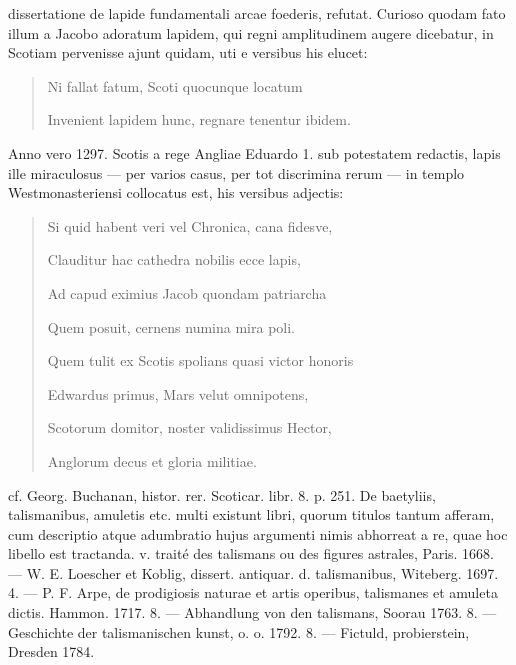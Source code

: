 \documentclass[a4paper, 11pt, oneside, polutonikogreek, german]{article}
\begin{document}
dissertatione de lapide fundamentali arcae foederis, refutat. Curioso quodam fato illum a Jacobo adoratum lapidem, qui regni amplitudinem augere dicebatur, in Scotiam pervenisse ajunt quidam, uti e versibus his elucet:
\begin{quotation}
Ni fallat fatum, Scoti quocunque locatum

Invenient lapidem hunc, regnare tenentur ibidem.
\end{quotation}
\hspace*{0mm}Anno vero 1297. Scotis a rege Angliae Eduardo 1. sub potestatem redactis, lapis ille miraculosus --- per varios casus, per tot discrimina rerum --- in templo Westmonasteriensi collocatus est, his versibus adjectis:
\begin{quotation}
Si quid habent veri vel Chronica, cana fidesve,

\hspace*{5mm}Clauditur hac cathedra nobilis ecce lapis,

Ad capud eximius Jacob quondam patriarcha

\hspace*{5mm}Quem posuit, cernens numina mira poli.

Quem tulit ex Scotis spolians quasi victor honoris

\hspace*{5mm}Edwardus primus, Mars velut omnipotens,

Scotorum domitor, noster validissimus Hector,

\hspace*{5mm}Anglorum decus et gloria militiae.
\end{quotation}
\hspace*{0mm}cf. Georg. Buchanan, histor. rer. Scoticar. libr. 8. p. 251. De baetyliis, talismanibus, amuletis etc. multi existunt libri, quorum titulos tantum afferam, cum descriptio atque adumbratio hujus argumenti nimis abhorreat a re, quae hoc libello est tractanda. v. traité des talismans ou des figures astrales, Paris. 1668. --- W. E. Loescher et Koblig, dissert. antiquar. d. talismanibus, Witeberg. 1697. 4. --- P. F. Arpe, de prodigiosis naturae et artis operibus, talismanes et amuleta dictis. Hammon. 1717. 8. --- Abhandlung von den talismans, Soorau 1763. 8. --- Geschichte der talismanischen kunst, o. o. 1792. 8. --- Fictuld, probierstein, Dresden 1784.
\end{document}
